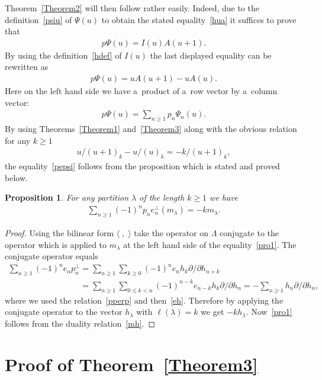 \documentclass[11pt]{article}
\newtheorem{proposition}{Proposition}
\numberwithin{equation}{section}
\renewcommand\ge{\geqslant}
\renewcommand\le{\leqslant}
\begin{document}
Theorem~\ref{Theorem2} will then follow rather easily.
Indeed, due to the def\/inition~\eqref{psiu} of $\Psi(u)$ to obtain the stated equality~\eqref{hua} it
suf\/f\/ices to prove that
\begin{gather*}%
p\Psi(u)=I(u)A(u+1).
\end{gather*}
By using the def\/inition~\eqref{hdef} of $I(u)$ the last displayed equality can be rewritten as
\begin{gather}
\label{pepsi}
p\Psi(u)=uA(u+1)-uA(u).
\end{gather}
Here on the left hand side we have a~product of a~row vector by a~column vector:
\begin{gather*}
p\Psi(u)=\sum_{n\ge1}p_n\Psi_n(u).
\end{gather*}
By using Theorems~\ref{Theorem1} and~\ref{Theorem3} along with the obvious relation for any $k\ge1$
\begin{gather*}
u/(u+1)_k-u/(u)_k=-k/(u+1)_k,
\end{gather*}
the equality~\eqref{pepsi} follows from the proposition which is
stated and proved below.
\begin{proposition}\label{Prop1}
For any partition $\lambda$ of the length $k\ge1$ we have
\begin{gather}\label{pro1}
\sum_{n\ge1}(-1)^np_ne_n^{\perp}(m_\lambda)=-km_\lambda.
\end{gather}
\end{proposition}
\begin{proof}
Using the bilinear form $\langle\;,\;\rangle$ take the operator on $\Lambda$ conjugate to the operator which
is applied to $m_\lambda$ at the left hand side of the equality~\eqref{pro1}.
The conjugate operator equals
\begin{gather*}
\sum_{n\ge1}(-1)^ne_np_n^{\perp}
=\sum_{n\ge1}\sum_{k\ge0}(-1)^ne_nh_k\partial /\partial h_{n+k}
\\
\phantom{\sum_{n\ge1}(-1)^ne_np_n^{\perp}}
=\sum_{n\ge1}\sum_{0\le k<n}(-1)^{n-k}e_{n-k}
h_k\partial /\partial h_n=-\sum_{n\ge1}h_n\partial /\partial h_n,
\end{gather*}
where we used the relation~\eqref{pperp} and then~\eqref{eh}.
Therefore by applying the conjugate operator to the vector $h_\lambda$ with $\ell(\lambda)=k$ we get
$- kh_\lambda$.
Now~\eqref{pro1} follows from the duality relation~\eqref{mh}.
\end{proof}

\section{Proof of Theorem~\ref{Theorem3}}\label{Section8}
\end{document}
